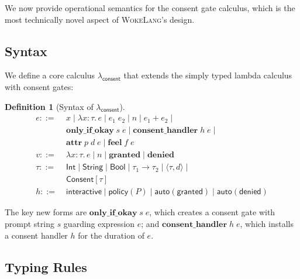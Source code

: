 \documentclass[11pt,a4paper]{article}
\newtheorem{definition}[theorem]{Definition}
\newcommand{\consent}{\mathsf{consent}}
\newcommand{\granted}{\mathsf{granted}}
\newcommand{\denied}{\mathsf{denied}}
\newcommand{\unitty}[1]{\langle #1 \rangle}
\newcommand{\WokeLang}{\textsc{WokeLang}}
\begin{document}
We now provide operational semantics for the consent gate calculus,
which is the most technically novel aspect of \WokeLang{}'s design.

\subsection{Syntax}

We define a core calculus $\lambda_{\consent}$ that extends the simply
typed lambda calculus with consent gates:

\begin{definition}[Syntax of $\lambda_{\consent}$]
\label{def:syntax}
\begin{align*}
  e ::=\; & x \mid \lambda x:\tau.\, e \mid e_1\; e_2 \mid n \mid
    e_1 + e_2 \mid \\
    & \mathbf{only\_if\_okay}\; s\; e \mid
    \mathbf{consent\_handler}\; h\; e \mid \\
    & \mathbf{attr}\; p\; d\; e \mid
    \mathbf{feel}\; f\; e \\[0.5em]
  v ::=\; & \lambda x:\tau.\, e \mid n \mid
    \mathbf{granted} \mid \mathbf{denied} \\[0.5em]
  \tau ::=\; & \mathsf{Int} \mid \mathsf{String} \mid
    \mathsf{Bool} \mid \tau_1 \to \tau_2 \mid
    \unitty{\tau, d} \mid \\
    & \mathsf{Consent}[\tau] \\[0.5em]
  h ::=\; & \mathsf{interactive} \mid
    \mathsf{policy}(P) \mid
    \mathsf{auto}(\granted) \mid
    \mathsf{auto}(\denied)
\end{align*}
\end{definition}

The key new forms are $\mathbf{only\_if\_okay}\; s\; e$, which
creates a consent gate with prompt string $s$ guarding expression $e$;
and $\mathbf{consent\_handler}\; h\; e$, which installs a consent
handler $h$ for the duration of $e$.

\subsection{Typing Rules}
\end{document}
